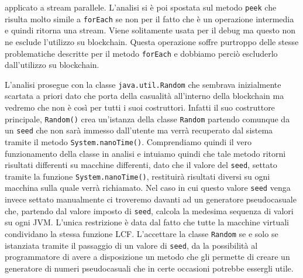 applicato a stream parallele. L'analisi si è poi spostata sul metodo \lstinline|peek| che risulta molto simile a \lstinline|forEach| se non per il fatto che è un operazione intermedia e quindi ritorna una stream. Viene solitamente usata per il debug ma questo non ne esclude l'utilizzo su blockchain. Questa operazione soffre purtroppo delle stesse problematiche descritte per il metodo \lstinline|forEach| e dobbiamo perciò escluderlo dall'utilizzo su blockchain.

L'analisi prosegue con la classe \lstinline|java.util.Random| che sembrava inizialmente scartata a priori dato che porta della casualità all'interno della blockchain ma vedremo che non è così per tutti i suoi costruttori. Infatti il suo costruttore principale, \lstinline|Random()| crea un'istanza della classe \lstinline|Random| partendo comunque da un \lstinline|seed| che non sarà immesso dall'utente ma verrà recuperato dal sistema tramite il metodo \lstinline|System.nanoTime()|. Comprendiamo quindi il vero funzionamento della classe in analisi e intuiamo quindi che tale metodo ritorni risultati differenti su macchine differenti, dato che il valore del \lstinline|seed|, settato tramite la funzione \lstinline|System.nanoTime()|, restituirà risultati diversi su ogni macchina sulla quale verrà richiamato. Nel caso in cui questo valore \lstinline|seed| venga invece settato manualmente ci troveremo davanti ad un generatore pseudocasuale che, partendo dal valore imposto di \lstinline|seed|, calcola la medesima sequenza di valori su ogni JVM. L'unica restrizione è data dal fatto che tutte la macchine virtuali condividano la stessa funzione LCF. L'accettare la classe \lstinline|Random| se e solo se istanziata tramite il passaggio di un valore di \lstinline|seed|, da la possibilità al programmatore di avere a disposizione un metodo che gli permette di creare un generatore di numeri pseudocasuali che in certe occasioni potrebbe essergli utile.

